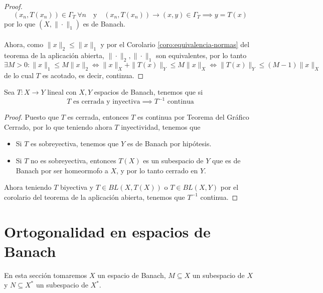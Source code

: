 \begin{teo}
\begin{proof}
    \begin{equation*}
        (x_n, T(x_n)) \in \Gamma_T \ \forall n \quad \text{y} \quad (x_n, T(x_n)) \to (x, y) \in \Gamma_T \implies y = T(x)
    \end{equation*}
    por lo que $(X,\|\cdot\|_1)$ es de Banach. \\ \\
    Ahora, como $\|x\|_2 \leq \|x\|_1$ y por el Corolario \ref{coro:equivalencia-normas} del teorema de la aplicación abierta, $\|\cdot\|_2, \|\cdot\|_1$ son equivalentes, por lo tanto
    \begin{equation*}
        \exists M > 0 : \|x\|_1 \leq M \|x\|_2 \iff \|x\|_X + \|T(x)\|_Y \leq M \|x\|_X \iff \|T(x)\|_Y \leq (M - 1) \|x\|_X
    \end{equation*}
    de lo cual $T$ es acotado, es decir, continua.
\end{proof}
\end{teo}

\begin{coro}
    Sea $T: X \to Y$ lineal con $X, Y$ espacios de Banach, tenemos que si 
    \begin{equation*}
        T \text{ es cerrada y inyectiva} \implies T^{-1} \text{ continua}
    \end{equation*}
\begin{proof}
    Puesto que $T$ es cerrada, entonces $T$ es continua por Teorema del Gráfico Cerrado, por lo que teniendo ahora $T$ inyectividad, tenemos que
    \begin{itemize}
        \item Si $T$ es sobreyectiva, tenemos que $Y$ es de Banach por hipótesis.
        \item Si $T$ no es sobreyectiva, entonces $T(X)$ es un subespacio de $Y$ que es de Banach por ser homeormofo a $X$, y por lo tanto cerrado en $Y$.
    \end{itemize}
    Ahora teniendo $T$ biyectiva y $T\in BL(X, T(X))$ o $T\in BL(X,Y)$ por el corolario del teorema de la aplicación abierta, tenemos que $T^{-1}$ continua.
\end{proof}
\end{coro}

\section{Ortogonalidad en espacios de Banach}

\noindent
En esta sección tomaremos $X$ un espacio de Banach, $M\subseteq X$ un subespacio de $X$ y $N\subseteq X^*$ un subespacio de $X^*$.

